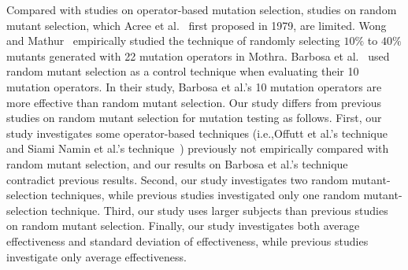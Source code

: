 Compared with studies on operator-based mutation selection,
studies on random mutant selection, which Acree et
al.~\cite{Acree:79} first proposed in 1979, are limited. Wong and
Mathur~\cite{Wong:93,Wong:95} empirically studied the technique of
randomly selecting $10\%$ to $40\%$ mutants generated with 22
mutation operators in Mothra. Barbosa et al.~\cite{Barbosa:01}
used random mutant selection as a control technique when
evaluating their 10 mutation operators. In their study, Barbosa et
al.'s 10 mutation operators are more effective than random mutant
selection. Our study differs from previous studies on random
mutant selection for mutation testing as follows. First, our study
investigates some operator-based techniques (i.e.,Offutt et al.'s
technique~\cite{Offutt:96} and Siami Namin et al.'s
technique~\cite{SiamiNamin:08}) previously not empirically
compared with random mutant selection, and our results on Barbosa
et al.'s technique~\cite{Barbosa:01} contradict previous results.
Second, our study investigates two random mutant-selection
techniques, while previous studies investigated only one random
mutant-selection technique. Third, our study uses larger subjects
than previous studies on random mutant selection. Finally, our
study investigates both average effectiveness and standard
deviation of effectiveness, while previous studies investigate
only average effectiveness.
